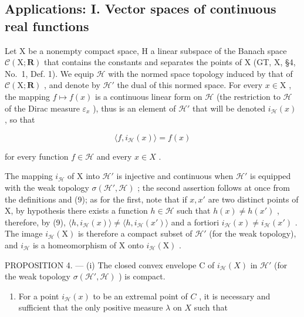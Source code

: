\subsection{Applications: I. Vector spaces of continuous real functions}

Let X be a nonempty compact space, H a linear subspace of the Banach space \(\mathcal{C}(\mathrm{X};\mathbf{R})\) that contains the constants and separates the points of X (GT, X, §4, No.~1, Def. 1). We equip \(\mathcal{H}\) with the normed space topology induced by that of \(\mathcal{C}(\mathrm{X};\mathbf{R})\) , and denote by \(\mathcal{H}'\) the dual of this normed space. For every \(x\in \mathrm{X}\) , the mapping \(f\mapsto f(x)\) is a continuous linear form on \(\mathcal{H}\) (the restriction to \(\mathcal{H}\) of the Dirac measure \(\varepsilon_{x}\) ), thus is an element of \(\mathcal{H}'\) that will be denoted \(i_{\mathcal{H}}(x)\) , so that

\[
\langle f, i _ {\mathcal {H}} (x) \rangle = f (x)\tag{9}
\]

for every function \(f \in \mathcal{H}\) and every \(x \in X\) .

The mapping \(i_{\mathcal{H}}\) of X into \(\mathcal{H}'\) is injective and continuous when \(\mathcal{H}'\) is equipped with the weak topology \(\sigma(\mathcal{H}', \mathcal{H})\) ; the second assertion follows at once from the definitions and (9); as for the first, note that if \(x, x'\) are two distinct points of X, by hypothesis there exists a function \(h \in \mathcal{H}\) such that \(h(x) \neq h(x')\) , therefore, by (9), \(\langle h, i_{\mathcal{H}}(x) \rangle \neq \langle h, i_{\mathcal{H}}(x') \rangle\) and a fortiori \(i_{\mathcal{H}}(x) \neq i_{\mathcal{H}}(x')\) . The image \(i_{\mathcal{H}}(\mathrm{X})\) is therefore a compact subset of \(\mathcal{H}'\) (for the weak topology), and \(i_{\mathcal{H}}\) is a homeomorphism of X onto \(i_{\mathcal{H}}(\mathrm{X})\) .

PROPOSITION 4. --- (i) The closed convex envelope C of \(i_{\mathcal{H}}(X)\) in \(\mathcal{H}'\) (for the weak topology \(\sigma(\mathcal{H}', \mathcal{H})\) ) is compact.

\begin{enumerate}
\def\labelenumi{(\roman{enumi})}
\setcounter{enumi}{1}
\tightlist
\item
  For a point \(i_{\mathcal{H}}(x)\) to be an extremal point of \(C\) , it is necessary and sufficient that the only positive measure \(\lambda\) on \(X\) such that
\end{enumerate}

